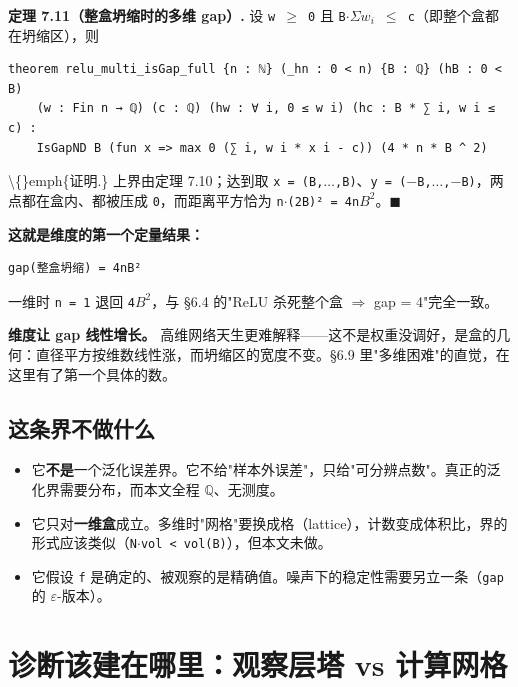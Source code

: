 \documentclass[11pt,a4paper]{ctexart}
\begin{document}
\textbf{定理 7.11（整盒坍缩时的多维 gap）.} 设 \texttt{w \ensuremath{\ge} 0} 且 \texttt{B\ensuremath{\cdot}\ensuremath{\Sigma}\ensuremath{w_{i}} \ensuremath{\le} c}（即整个盒都在坍缩区），则

\begin{lstlisting}
theorem relu_multi_isGap_full {n : ℕ} (_hn : 0 < n) {B : ℚ} (hB : 0 < B)
    (w : Fin n → ℚ) (c : ℚ) (hw : ∀ i, 0 ≤ w i) (hc : B * ∑ i, w i ≤ c) :
    IsGapND B (fun x => max 0 (∑ i, w i * x i - c)) (4 * n * B ^ 2)
\end{lstlisting}

\textbackslash\{\}emph\{证明.\} 上界由定理 7.10；达到取 \texttt{x = (B,\ensuremath{\ldots},B)}、\texttt{y = (\ensuremath{-}B,\ensuremath{\ldots},\ensuremath{-}B)}，两点都在盒内、都被压成 \texttt{0}，而距离平方恰为 \texttt{n\ensuremath{\cdot}(2B)² = 4n\ensuremath{B^{2}}}。\ensuremath{\ensuremath{\blacksquare}}

\textbf{这就是维度的第一个定量结果：}

\begin{lstlisting}
gap(整盒坍缩) = 4nB²
\end{lstlisting}

一维时 \texttt{n = 1} 退回 \texttt{4\ensuremath{B^{2}}}，与 §6.4 的"ReLU 杀死整个盒 \ensuremath{\Longrightarrow} gap = 4"完全一致。

\textbf{维度让 gap 线性增长。} 高维网络天生更难解释——这不是权重没调好，是盒的几何：直径平方按维数线性涨，而坍缩区的宽度不变。§6.9 里"多维困难"的直觉，在这里有了第一个具体的数。

\subsection{这条界不做什么}

\begin{itemize}
\item 它\textbf{不是}一个泛化误差界。它不给"样本外误差"，只给"可分辨点数"。真正的泛化界需要分布，而本文全程 \ensuremath{\mathbb{Q}}、无测度。
\item 它只对\textbf{一维盒}成立。多维时"网格"要换成格（lattice），计数变成体积比，界的形式应该类似（\texttt{N\ensuremath{\cdot}vol < vol(B)}），但本文未做。
\item 它假设 \texttt{f} 是确定的、被观察的是精确值。噪声下的稳定性需要另立一条（\texttt{gap} 的 \ensuremath{\varepsilon}-版本）。
\end{itemize}

\bigskip

\section{诊断该建在哪里：观察层塔 vs 计算网格}
\end{document}
